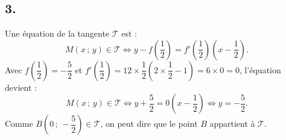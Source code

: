 	
	\subsection*{3.}
	Une équation de la tangente \( \mathcal T \) est :
	\[
	M(x\,;\,y) \in  \mathcal T \iff y - f\left(\dfrac{1}{2}\right) = f'\left(\dfrac{1}{2}\right)\left(x - \dfrac{1}{2}\right).
	\]
	Avec \( f\left(\dfrac{1}{2}\right) = -\dfrac{5}{2} \) et \( f'\left(\dfrac{1}{2}\right) = 12 \times \dfrac{1}{2} \left(2 \times \dfrac{1}{2} - 1\right) = 6 \times 0 = 0 \), l'équation devient :
	\[
	M(x\,;\,y) \in  \mathcal T \iff y + \dfrac{5}{2} = 0 \left(x - \dfrac{1}{2}\right) \iff y = -\dfrac{5}{2}.
	\]
	Comme $ B\left(0\,;\,-\dfrac{5}{2}\right) \in  \mathcal T$, on peut dire que le point \( B \) appartient à \(  \mathcal T \).
